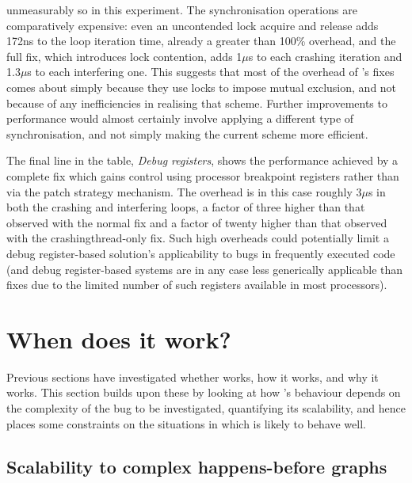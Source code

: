 unmeasurably so in this experiment.  The synchronisation operations
are comparatively expensive: even an uncontended lock acquire and
release adds 172ns to the loop iteration time, already a greater than
100\% overhead, and the full fix, which introduces lock contention,
adds 1$\mu$s to each crashing iteration and 1.3$\mu$s to each
interfering one.  This suggests that most of the overhead of
{\technique}'s fixes comes about simply because they use locks to
impose mutual exclusion, and not because of any inefficiencies in
realising that scheme.  Further improvements to performance would
almost certainly involve applying a different type of synchronisation,
and not simply making the current scheme more efficient.

The final line in the table, \textit{Debug registers}, shows the
performance achieved by a complete fix which gains control using
processor breakpoint registers rather than via the patch strategy
mechanism.  The overhead is in this case roughly 3$\mu$s in both the
crashing and interfering loops, a factor of three higher than that
observed with the normal {\technique} fix and a factor of twenty
higher than that observed with the \gls{crashingthread}-only
{\technique} fix.  Such high overheads could potentially limit a debug
register-based solution's applicability to bugs in frequently executed
code (and debug register-based systems are in any case less
generically applicable than {\technique} fixes due to the limited
number of such registers available in most processors).

\section{When does it work?}
\label{sect:eval:does_it_scale}

Previous sections have investigated whether {\technique} works, how it
works, and why it works.  This section builds upon these by looking at
how {\technique}'s behaviour depends on the complexity of the bug to
be investigated, quantifying its scalability, and hence places some
constraints on the situations in which {\technique} is likely to
behave well.

\subsection{Scalability to complex happens-before graphs}
\label{sect:eval:complex_hb}

